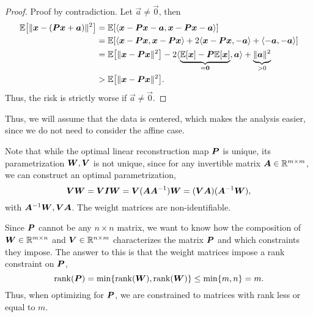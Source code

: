 \begin{proof}
    Proof by contradiction. Let $\vec{a} \neq \vec{0}$, then
    \begin{align*}
        \E\lft[\| \vec{x} - (\mat{P}\vec{x} + \vec{a}) \|^2\rgt] & = \E \lft[ \ang{\vec{x}-\mat{P}\vec{x}-\vec{a}, \vec{x}-\mat{P}\vec{x}-\vec{a}} \rgt]                                                                          \\
                                                                 & = \E \lft[ \ang{\vec{x}-\mat{P}\vec{x},\vec{x}-\mat{P}\vec{x}} + 2 \ang{\vec{x}-\mat{P}\vec{x},-\vec{a}} + \ang{-\vec{a},-\vec{a}} \rgt]                       \\
                                                                 & = \E \lft[ \| \vec{x}-\mat{P}\vec{x} \|^2 \rgt] - 2 \ang{\underbrace{\E[\vec{x}] - \mat{P} \E[\vec{x}]}_{=\vec{0}}, \vec{a}} + \underbrace{\|\vec{a}\|^2}_{>0} \\
                                                                 & > \E \lft[ \| \vec{x}-\mat{P}\vec{x} \|^2 \rgt].
    \end{align*}
    Thus, the risk is strictly worse if $\vec{a} \neq \vec{0}$.
\end{proof}

Thus, we will assume that the data is centered, which makes the analysis easier, since we do not
need to consider the affine case.

\begin{important}
    Note that while the optimal linear reconstruction map $\bm{P}$ is unique, its parametrization
    $\bm{W},\bm{V}$ is not unique, since for any invertible matrix $\bm{A} \in \mathbb{R}^{m\times m}$, we
    can construct an optimal parametrization, \[
        \bm{V}\bm{W} = \bm{V} \bm{I} \bm{W} = \bm{V} (\bm{A} \bm{A}^{-1}) \bm{W} = (\bm{V}\bm{A})(\bm{A}^{-1}\bm{W}),
    \]
    with $\bm{A}^{-1}\bm{W}, \bm{V}\bm{A}$. The weight matrices are non-identifiable.
\end{important}

\begin{important}
    Since $\bm{P}$ cannot be any $n\times n$ matrix, we want to know how the composition of $\bm{W}
        \in \mathbb{R}^{m\times n}$ and $\bm{V} \in \mathbb{R}^{n\times m}$ characterizes the matrix $\bm{P}$ and which
    constraints they impose. The answer to this is that the weight matrices impose a rank constraint on
    $\bm{P}$, \[
        \mathrm{rank}(\bm{P}) = \min \{ \mathrm{rank}(\bm{W}), \mathrm{rank}(\bm{W}) \} \leq \min \{ m, n \} = m.
    \]
    Thus, when optimizing for $\bm{P}$, we are constrained to matrices with rank less or equal to $m$.
\end{important}

